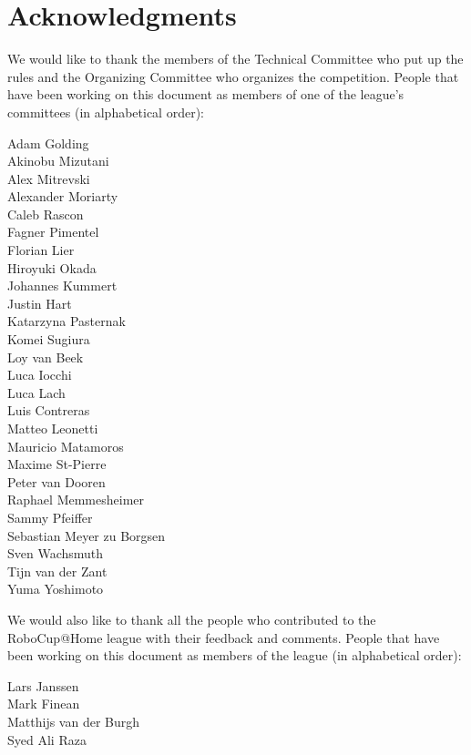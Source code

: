 \section*{Acknowledgments}
\label{sec:acknowledgments}
We would like to thank the members of the Technical Committee who put up the rules and the Organizing Committee who organizes the competition.
People that have been working on this document as members of one of the league's committees (in alphabetical order):
\begin{center}
	\begin{minipage}{0.8\textwidth}
		\begin{multicols}{3}%
			\footnotesize
			\noindent%
			Adam Golding\\
			Akinobu Mizutani\\
			Alex Mitrevski\\
			Alexander Moriarty\\
			Caleb Rascon\\
			Fagner Pimentel\\
			Florian Lier\\
			Hiroyuki Okada\\
			Johannes Kummert\\
			Justin Hart\\
			Katarzyna Pasternak\\
			Komei Sugiura\\
			Loy van Beek\\
			Luca Iocchi\\
			Luca Lach\\
			Luis Contreras\\
			Matteo Leonetti\\
			Mauricio Matamoros\\
			Maxime St-Pierre\\
			Peter van Dooren\\
			Raphael Memmesheimer\\
			Sammy Pfeiffer\\
			Sebastian Meyer zu Borgsen\\
			Sven Wachsmuth\\
			Tijn van der Zant\\
			Yuma Yoshimoto
		\end{multicols}
	\end{minipage}
\end{center}

\noindent We would also like to thank all the people who contributed to the RoboCup@Home league with their feedback and comments.
People that have been working on this document as members of the league (in alphabetical order):
\begin{center}
	\begin{minipage}{0.8\textwidth}
		\begin{multicols}{2}%
			\footnotesize
			\noindent%
			Lars Janssen\\
			Mark Finean\\
			Matthijs van der Burgh\\
			Syed Ali Raza\\
		\end{multicols}
	\end{minipage}
\end{center}



